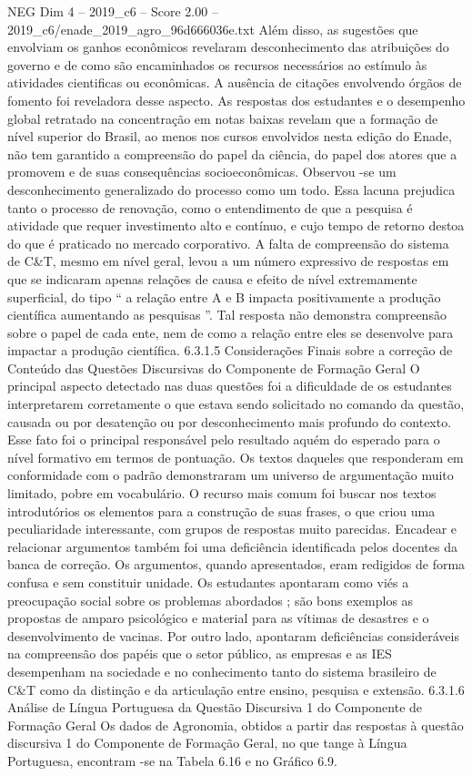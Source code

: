 \begin{textsample}{NEG Dim 4 – 2019\_c6 – Score 2.00 – 2019\_c6/enade\_2019\_agro\_96d666036e.txt}
Além disso, as sugestões que envolviam os ganhos econômicos revelaram desconhecimento das atribuições do governo e de como são encaminhados os recursos necessários ao estímulo às atividades cientificas ou econômicas.
A ausência de citações envolvendo órgãos de fomento foi reveladora desse aspecto.
As respostas dos estudantes e o desempenho global retratado na concentração em notas baixas revelam que a formação de nível superior do Brasil, ao menos nos cursos envolvidos nesta edição do Enade, não tem garantido a compreensão do papel da ciência, do papel dos atores que a promovem e de suas consequências socioeconômicas.
Observou -se um desconhecimento generalizado do processo como um todo.
Essa lacuna prejudica tanto o processo de renovação, como o entendimento de que a pesquisa é atividade que requer investimento alto e contínuo, e cujo tempo de retorno destoa do que é praticado no mercado corporativo.
A falta de compreensão do sistema de C\&T, mesmo em nível geral, levou a um número expressivo de respostas em que se indicaram apenas relações de causa e efeito de nível extremamente superficial, do tipo “ a relação entre A e B impacta positivamente a produção científica aumentando as pesquisas ”.
Tal resposta não demonstra compreensão sobre o papel de cada ente, nem de como a relação entre eles se desenvolve para impactar a produção científica. 6.3.1.5 Considerações Finais sobre a correção de Conteúdo das Questões Discursivas do Componente de Formação Geral O principal aspecto detectado nas duas questões foi a dificuldade de os estudantes interpretarem corretamente o que estava sendo solicitado no comando da questão, causada ou por desatenção ou por desconhecimento mais profundo do contexto.
Esse fato foi o principal responsável pelo resultado aquém do esperado para o nível formativo em termos de pontuação.
Os textos daqueles que responderam em conformidade com o padrão demonstraram um universo de argumentação muito limitado, pobre em vocabulário.
O recurso mais comum foi buscar nos textos introdutórios os elementos para a construção de suas frases, o que criou uma peculiaridade interessante, com grupos de respostas muito parecidas.
Encadear e relacionar argumentos também foi uma deficiência identificada pelos docentes da banca de correção.
Os argumentos, quando apresentados, eram redigidos de forma confusa e sem constituir unidade.
Os estudantes apontaram como viés a preocupação social sobre os problemas abordados ; são bons exemplos as propostas de amparo psicológico e material para as vítimas de desastres e o desenvolvimento de vacinas.
Por outro lado, apontaram deficiências consideráveis na compreensão dos papéis que o setor público, as empresas e as IES desempenham na sociedade e no conhecimento tanto do sistema brasileiro de C\&T como da distinção e da articulação entre ensino, pesquisa e extensão. 6.3.1.6 Análise de Língua Portuguesa da Questão Discursiva 1 do Componente de Formação Geral Os dados de Agronomia, obtidos a partir das respostas à questão discursiva 1 do Componente de Formação Geral, no que tange à Língua Portuguesa, encontram -se na Tabela 6.16 e no Gráfico 6.9.

\end{textsample}
